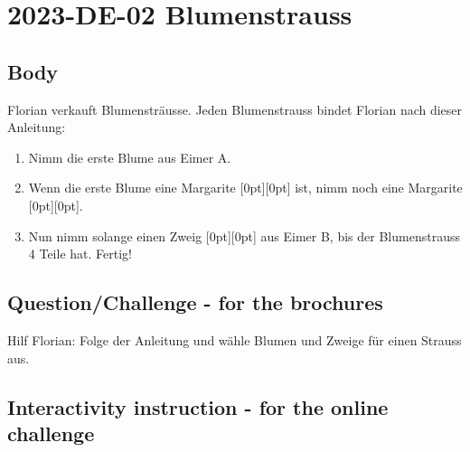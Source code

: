 \documentclass[a4paper,11pt]{report}
\newcommand{\taskGraphicsFolder}{..}
\begin{document}
\section*{\centering{} 2023-DE-02 Blumenstrauss}


\subsection*{Body}

{\centering%
\par}

Florian verkauft Blumensträusse. Jeden Blumenstrauss bindet Florian nach dieser Anleitung:

\begin{enumerate}
  \item Nimm die erste Blume aus Eimer A.
  \item Wenn die erste Blume eine Margarite \raisebox{\dimexpr -0.5ex -1.0ex \relax}[0pt][0pt]{} ist, nimm noch eine Margarite \raisebox{\dimexpr -0.5ex -1.0ex \relax}[0pt][0pt]{}.
  \item Nun nimm solange einen Zweig \raisebox{\dimexpr -0.5ex -0.5ex \relax}[0pt][0pt]{} aus Eimer B, bis der Blumenstrauss $4$ Teile hat. Fertig!
\end{enumerate}

{\em


\subsection*{Question/Challenge - for the brochures}

Hilf Florian: Folge der Anleitung und wähle Blumen und Zweige für einen Strauss aus.

{\centering%
\par}

}


\subsection*{Interactivity instruction - for the online challenge}
\end{document}
